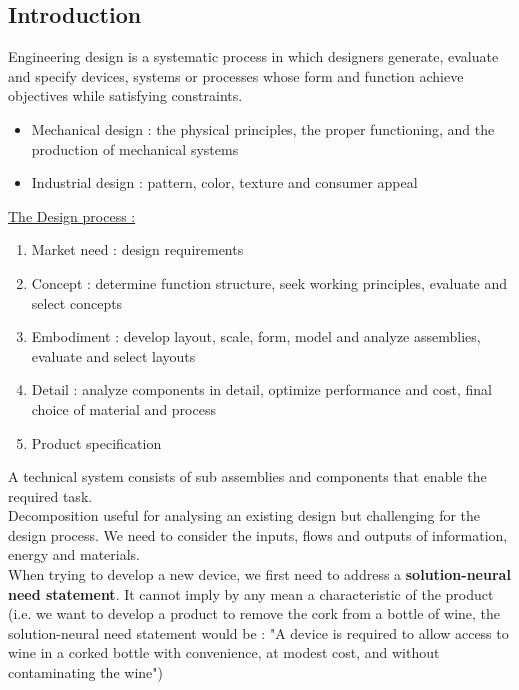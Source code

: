 \documentclass[../main.tex]{subfiles}
\begin{document}
\localtableofcontents
\subsection{Introduction}
Engineering design is a systematic process in which designers generate, evaluate and specify devices, systems or processes whose form and function achieve objectives while satisfying constraints.\\

\begin{itemize}
    \item Mechanical design : the physical principles, the proper functioning, and the production of mechanical systems\\
    \item Industrial design : pattern, color, texture and consumer appeal\\
\end{itemize}

\quad \underline{The Design process :}\\
\begin{enumerate}
    \item Market need : design requirements\\
    \item Concept : determine function structure, seek working principles, evaluate and select concepts\\
    \item Embodiment : develop layout, scale, form, model and analyze assemblies, evaluate and select layouts\\
    \item Detail : analyze components in detail, optimize performance and cost, final choice of material and process\\
    \item Product specification\\
\end{enumerate}

A technical system consists of sub assemblies and components that enable the required task.\\
Decomposition useful for analysing an existing design but challenging for the design process. We need to consider the inputs, flows and outputs of information, energy and materials.\\

When trying to develop a new device, we first need to address a \textbf{solution-neural need statement}. It cannot imply by any mean a characteristic of the product (i.e. we want to develop a product to remove the cork from a bottle of wine, the solution-neural need statement would be : "A device is required to allow access to wine in a corked bottle with convenience, at modest cost, and without contaminating the wine")\\
\end{document}
